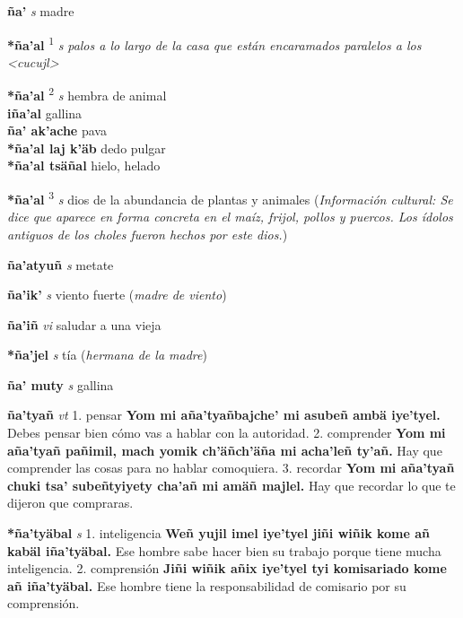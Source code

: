 \documentclass[10pt]{scrbook}
\newcommand{\entry}[1]{\textbf{#1}}
\newcommand{\onedefinition}[1]{#1.}
\newcommand{\defsuperscript}[1]{\textsuperscript{#1}}
\newcommand{\nontranslationdef}[1]{\textit{#1}}
\newcommand{\partofspeech}[1]{\textit{#1}}
\newcommand{\spanishtranslation}[1]{#1}
\newcommand{\clarification}[1]{(\textit{#1})}
\newcommand{\cholexample}[1]{\textbf{#1}}
\newcommand{\exampletranslation}[1]{#1}
\newcommand{\culturalinformation}[1]{(\textit{#1})}
\newcommand{\secondaryentry}[1]{\\\textbf{#1}}
\newcommand{\secondtranslation}[1]{#1}
\begin{document}
\begin{multicols}{2}
\entry{ña'}
\partofspeech{s}
\spanishtranslation{madre}

\entry{*ña'al}
\defsuperscript{1}
\partofspeech{s}
\nontranslationdef{palos a lo largo de la casa que están encaramados paralelos a los <cucujl>}

\entry{*ña'al}
\defsuperscript{2}
\partofspeech{s}
\spanishtranslation{hembra de animal}
\secondaryentry{iña'al}
\secondtranslation{gallina}
\secondaryentry{ña' ak'ache}
\secondtranslation{pava}
\secondaryentry{*ña'al laj k'äb}
\secondtranslation{dedo pulgar}
\secondaryentry{*ña'al tsäñal}
\secondtranslation{hielo, helado}

\entry{*ña'al}
\defsuperscript{3}
\partofspeech{s}
\spanishtranslation{dios de la abundancia de plantas y animales}
\culturalinformation{Información cultural: Se dice que aparece en forma concreta en el maíz, frijol, pollos y puercos. Los ídolos antiguos de los choles fueron hechos por este dios.}

\entry{ña'atyuñ}
\partofspeech{s}
\spanishtranslation{metate}

\entry{ña'ik'}
\partofspeech{s}
\spanishtranslation{viento fuerte}
\clarification{madre de viento}

\entry{ña'iñ}
\partofspeech{vi}
\spanishtranslation{saludar a una vieja}

\entry{*ña'jel}
\partofspeech{s}
\spanishtranslation{tía}
\clarification{hermana de la madre}

\entry{ña' muty}
\partofspeech{s}
\spanishtranslation{gallina}

\entry{ña'tyañ}
\partofspeech{vt}
\onedefinition{1}
\spanishtranslation{pensar}
\cholexample{Yom mi aña'tyañbajche' mi asubeñ ambä iye'tyel.}
\exampletranslation{Debes pensar bien cómo vas a hablar con la autoridad.}
\onedefinition{2}
\spanishtranslation{comprender}
\cholexample{Yom mi aña'tyañ pañimil, mach yomik ch'äñch'äña mi acha'leñ ty'añ.}
\exampletranslation{Hay que comprender las cosas para no hablar comoquiera.}
\onedefinition{3}
\spanishtranslation{recordar}
\cholexample{Yom mi aña'tyañ chuki tsa' subeñtyiyety cha'añ mi amäñ majlel.}
\exampletranslation{Hay que recordar lo que te dijeron que compraras.}

\entry{*ña'tyäbal}
\partofspeech{s}
\onedefinition{1}
\spanishtranslation{inteligencia}
\cholexample{Weñ yujil imel iye'tyel jiñi wiñik kome añ kabäl iña'tyäbal.}
\exampletranslation{Ese hombre sabe hacer bien su trabajo porque tiene mucha inteligencia.}
\onedefinition{2}
\spanishtranslation{comprensión}
\cholexample{Jiñi wiñik añix iye'tyel tyi komisariado kome añ iña'tyäbal.}
\exampletranslation{Ese hombre tiene la responsabilidad de comisario por su comprensión.}


\end{multicols}
\end{document}
